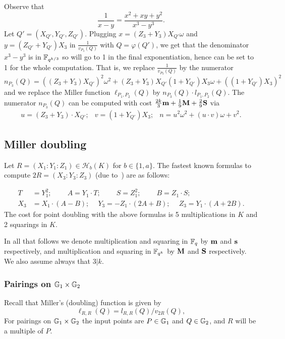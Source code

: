 Observe that
\[\frac{1}{x-y} = \frac{x^2 + xy + y^2}{x^3-y^3}.\]
Let $Q' = (X_{Q'},Y_{Q'},Z_{Q'})$.
Plugging $x = (Z_3 + Y_3)X_{Q'}\omega$ and $y = (Z_{Q'}+Y_{Q'})X_3$ in $\frac{1}{v_{P_3}(Q)}$ with $Q = \varphi(Q')$,
we get that the denominator $x^3 - y^3$ is in $\mathbb{F}_{q^{k/3}}$ so will go to 1 in the final exponentiation, hence can be set to 1 for the whole computation.
That is, we replace $\frac{1}{v_{P_3}(Q)}$ by the numerator 
$$n_{P_3}(Q) = ((Z_3 + Y_3)X_{Q'})^2\omega^2 
+ (Z_3 + Y_3)X_{Q'}(1+Y_{Q'})X_3\omega 
+ ((1+Y_{Q'})X_3)^2$$
and we replace the Miller function 
$\ell_{P_1,P_2}(Q)$ by $n_{P_3}(Q) \cdot l_{P_1,P_2}(Q)$.
The numerator $n_{P_3}(Q)$ can be computed with cost
$\frac{2k}{3}\textbf{m} + \frac{1}{9}\textbf{M} + \frac{2}{9}\textbf{S}$
via
\[\begin{array}{cccc}
u = (Z_3 + Y_3)\cdot X_{Q'}; &
v = (1+Y_{Q'})X_3; &
n = u^2\omega^2 + (u\cdot v)\omega + v^2.
\end{array}\]

\subsection{Miller doubling}

Let $R = (X_1 : Y_1 : Z_1) \in \mathcal{H}_b(K)$ for $b \in \{1,a\}$.
The fastest known formulas to compute $2R = (X_3 : Y_3 : Z_3)$
(due to~\cite{2010/hess}) are as follows:

\begin{align*}
T &= Y_1^2;\	\qquad	A = Y_1 \cdot T;\	\qquad
S = Z_1 ^ 2;\	\qquad	B = Z_1 \cdot S;\\
X_3 &= X_1 \cdot (A - B);\	\quad
Y_3 = -Z_1 \cdot (2A + B);\	\quad
Z_3 = Y_1 \cdot (A + 2B).
\end{align*}
The cost for point doubling with the above formulas is 5 multiplications in $K$ and 2 squarings in $K$.

In all that follows we denote multiplication and squaring in $\mathbb{F}_{q}$ by $\textbf{m}$ and $\textbf{s}$ respectively, and multiplication and squaring in $\mathbb{F}_{q^k}$ by $\textbf{M}$ and $\textbf{S}$ respectively. We also assume always that $3|k$.

\subsubsection{Pairings on $\mathbb{G}_{1} \times \mathbb{G}_{2}$}

Recall that Miller's (doubling) function is given by
$$\ell_{R,R}(Q) = l_{R,R}(Q)/v_{2R}(Q),$$
For pairings on $\mathbb{G}_{1} \times \mathbb{G}_{2}$ the input points are
$P \in \mathbb{G}_{1}$ and $Q \in \mathbb{G}_{2}$, and
$R$ will be a multiple of $P$.

